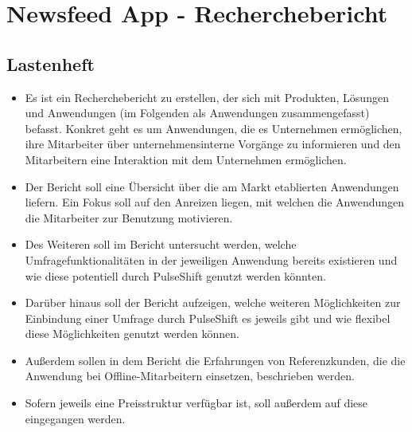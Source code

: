 \section{Newsfeed App - Recherchebericht}
\label{section:realisation:newsfeed_app}

\subsection{Lastenheft}
\begin{itemize}
\item Es ist ein Recherchebericht zu erstellen, der sich mit Produkten, Lösungen und Anwendungen (im Folgenden als Anwendungen zusammengefasst) befasst. Konkret geht es um Anwendungen, die es Unternehmen ermöglichen, ihre Mitarbeiter über unternehmensinterne Vorgänge zu informieren und den Mitarbeitern eine Interaktion mit dem Unternehmen ermöglichen. 
\item Der Bericht soll eine Übersicht über die am Markt etablierten Anwendungen liefern. Ein Fokus soll auf den Anreizen liegen, mit welchen die Anwendungen die Mitarbeiter zur Benutzung motivieren.
\item Des Weiteren soll im Bericht untersucht werden, welche Umfragefunktionalitäten in der jeweiligen Anwendung bereits existieren und wie diese potentiell durch PulseShift genutzt werden könnten. 
\item Darüber hinaus soll der Bericht aufzeigen, welche weiteren Möglichkeiten zur Einbindung einer Umfrage durch PulseShift es jeweils gibt und wie flexibel diese Möglichkeiten genutzt werden können.
\item Außerdem sollen in dem Bericht die Erfahrungen von Referenzkunden, die die Anwendung bei Offline-Mitarbeitern einsetzen, beschrieben werden. 
\item Sofern jeweils eine Preisstruktur verfügbar ist, soll außerdem auf diese eingegangen werden.
\end{itemize}

